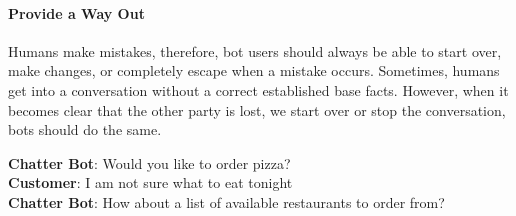 \paragraph{Provide a Way Out}
Humans make mistakes, therefore, bot users should always be able to start over, make changes, or completely escape when a mistake occurs. Sometimes, humans get into a conversation without a correct established base facts. However, when it becomes clear that the other party is lost, we start over or stop the conversation, bots should do the same.\\

{ \selectfont
 
  \color{red}
  \textbf{Chatter Bot}: Would you like to order pizza? \\
  
  \color{blue}
  \textbf{Customer}: I am not sure what to eat tonight \\
 
  \color{red}
  \textbf{Chatter Bot}: How about a list of available restaurants to order from? \\
  
  \color{black}
}









